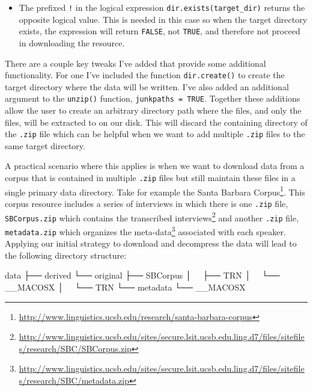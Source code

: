 \documentclass[
]{article}
\newenvironment{Shaded}{\begin{snugshade}}{\end{snugshade}}
\newcommand{\ExtensionTok}[1]{#1}
\newcommand{\NormalTok}[1]{#1}
\DeclareRobustCommand{\href}[2]{#2\footnote{\url{#1}}}
\newenvironment{rmdblock}[1]
  {\begin{shaded*}
  \begin{itemize}
  \renewcommand{\labelitemi}{
    \raisebox{-.5\height}[0pt][0pt]{
      {\setkeys{Gin}{width=2em,keepaspectratio}\texttt{[image: assets/images/\#1]}}
    }
  }
  \item
  }
  {
  \end{itemize}
  \end{shaded*}
  }
\newenvironment{rmdtip}
  {\begin{rmdblock}{tip}}
  {\end{rmdblock}}
\begin{document}
\begin{rmdtip}
The prefixed \texttt{!} in the logical expression
\texttt{dir.exists(target\_dir)} returns the opposite logical value.
This is needed in this case so when the target directory exists, the
expression will return \texttt{FALSE}, not \texttt{TRUE}, and therefore
not proceed in downloading the resource.
\end{rmdtip}

There are a couple key tweaks I've added that provide some additional functionality. For one I've included the function \texttt{dir.create()} to create the target directory where the data will be written. I've also added an additional argument to the \texttt{unzip()} function, \texttt{junkpaths\ =\ TRUE}. Together these additions allow the user to create an arbitrary directory path where the files, and only the files, will be extracted to on our disk. This will discard the containing directory of the \texttt{.zip} file which can be helpful when we want to add multiple \texttt{.zip} files to the same target directory.

A practical scenario where this applies is when we want to download data from a corpus that is contained in multiple \texttt{.zip} files but still maintain these files in a single primary data directory. Take for example the \href{http://www.linguistics.ucsb.edu/research/santa-barbara-corpus}{Santa Barbara Corpus}. This corpus resource includes a series of interviews in which there is one \texttt{.zip} file, \texttt{SBCorpus.zip} which contains the \href{http://www.linguistics.ucsb.edu/sites/secure.lsit.ucsb.edu.ling.d7/files/sitefiles/research/SBC/SBCorpus.zip}{transcribed interviews} and another \texttt{.zip} file, \texttt{metadata.zip} which organizes the \href{http://www.linguistics.ucsb.edu/sites/secure.lsit.ucsb.edu.ling.d7/files/sitefiles/research/SBC/metadata.zip}{meta-data} associated with each speaker. Applying our initial strategy to download and decompress the data will lead to the following directory structure:

\begin{Shaded}
\begin{Highlighting}[]
\ExtensionTok{data}
\ExtensionTok{├──}\NormalTok{ derived}
\ExtensionTok{└──}\NormalTok{ original}
    \ExtensionTok{├──}\NormalTok{ SBCorpus}
    \ExtensionTok{│  }\NormalTok{ ├── TRN}
    \ExtensionTok{│  }\NormalTok{ └── \_\_MACOSX}
    \ExtensionTok{│  }\NormalTok{     └── TRN}
    \ExtensionTok{└──}\NormalTok{ metadata}
        \ExtensionTok{└──}\NormalTok{ \_\_MACOSX}
\end{Highlighting}
\end{Shaded}
\end{document}
